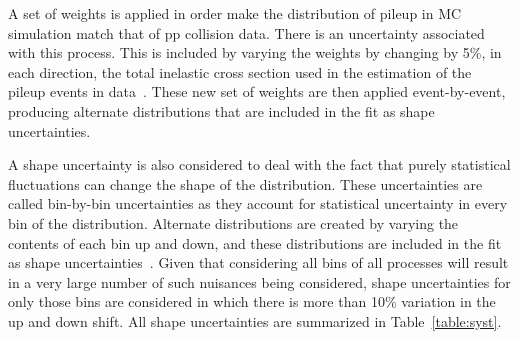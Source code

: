 A set of weights is applied in order make the distribution of pileup in MC simulation match that of pp collision data. There is an uncertainty associated with this process. This is included  by varying the weights by changing by 5\%, in each direction, the total inelastic cross section used in the estimation of the pileup events in data~\cite{Sirunyan:2018nqx}. These new set of weights are then applied event-by-event, producing alternate distributions that are included in the fit as shape uncertainties.

A shape uncertainty is also considered to deal with the fact that purely statistical fluctuations can change the shape of the distribution. These uncertainties are called bin-by-bin uncertainties as they account for statistical uncertainty in every bin of the distribution. Alternate distributions are created by varying the contents of each bin up and down, and these distributions are included in the fit as shape uncertainties~\cite{BARLOW}. Given that considering all bins of all processes will result in a very large number of such nuisances being considered, shape uncertainties for only those bins are considered in which there is more than 10\% variation in the up and down shift. All shape uncertainties are summarized in Table~\ref{table:syst}.


%
% 
% 



